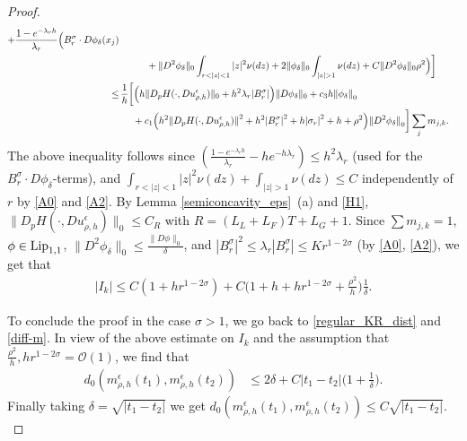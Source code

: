 \documentclass[a4paper,  twoside, 10pt, leqno]{amsart}
\theoremstyle{remark}
\theoremstyle{definition}
\begin{document}
\begin{proof}
\begin{align*}
+ \frac{1-e^{-\lambda_r h}}{\lambda_r}\Big(B^\sigma_r \cdot D\phi_{\delta}(x_j)  \\
 & \hspace*{1cm}+ \|D^2\phi_{\delta}\|_{0}\int_{r< | z | <1}|z|^2 \nu(dz)  + 2\|\phi_{\delta}\|_{0} \int_{|z|>1} \nu(dz) + C\|D^2 \phi_{\delta}\|_{0}\rho^2 \Big) \bigg] \\
\leq  &\,  \frac{1}{h} \bigg[\Big(h  \| D_pH(\cdot,Du_{\rho,h}^{\epsilon}) \|_0  + h^2 \lambda_r | B^\sigma_r|\Big)\|D\phi_{\delta}\|_0 + c_3 h {\|  \phi_{\delta} \|}_0 
			\\ & \hspace{0.5cm} + c_1 \Big(h^2 {\| D_pH(\cdot,Du_{\rho,h}^{\epsilon}) \|}^2 + h^2 {| B^\sigma_r | }^2 + h{|\sigma_r|}^2 + h + \rho^2\Big ) {\| D^2 \phi_{\delta} \|}_0  \bigg]  \sum_j m_{j,k}.
\end{align*}
The above inequality follows since $(\frac{1-e^{-\lambda_r h}}{\lambda_r} -h e^{-h\lambda_r}) \leq h^2\lambda_r$ 
 (used for the $B_r^{\sigma}\cdot D\phi_{\delta}$-terms), and $\int_{r<| z | <1} {| z | }^2  \nu(dz) + \int_{|z|>1} \nu(dz) \leq C$ independently of $r$  by \ref{A0} and \ref{A2}.  
By Lemma \ref{semiconcavity_eps}~(a) and 
 \ref{H1}, $\|D_pH(\cdot, Du_{\rho,h}^{\epsilon})\|_0\leq C_R$ with $R=( L_{L} + L_{F} )T + L_{G}+1$. Since $\sum m_{j,k} =1$, $\phi\in \textup{Lip}_{1,1}$, $\|D^2\phi_{\delta}\|_{0} \leq \frac{\|D\phi\|_{0}}{\delta}$, and $ |B^{\sigma}_r|^2\leq \lambda_r |B_r^{\sigma}| \leq K r^{1-2\sigma}$ (by \ref{A0}, \ref{A2}), we get that 
\begin{align*} %
|I_k| 
\leq  C(1+h r ^{1-2 \sigma} )  + C\big(1 +   h +h r ^{1-2 \sigma}  + \frac{\rho^2}{h}\big) \frac{1}{\delta}.
\end{align*}

To conclude the proof in the case $\sigma>1$, we go back to \eqref{regular_KR_dist} and \eqref{diff-m}. In view of the above estimate on $I_k$ and the assumption that $\frac{\rho^2}{h},h r^{1-2\sigma}=\mathcal{O}(1)$, we find that
\begin{align*}%
d_0(m^{\epsilon}_{\rho,h}(t_1),m^{\epsilon}_{\rho,h}(t_2))
&\leq 2\delta + C |t_1-t_2|\Big(1+\frac{1}{\delta}\Big). 
\end{align*}
Finally taking $ \delta = \sqrt{|t_1-t_2|}$ we get 
$d_0(m^{\epsilon}_{\rho,h}(t_1),m^{\epsilon}_{\rho,h}(t_2)) \leq C\sqrt{|t_1-t_2|}.$ \medskip


\end{proof}
\end{document}
